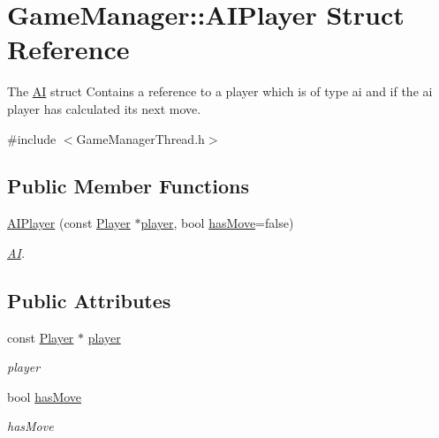\hypertarget{structGameManager_1_1AIPlayer}{\section{Game\-Manager\-:\-:A\-I\-Player Struct Reference}
\label{structGameManager_1_1AIPlayer}
}


The \hyperlink{classAI}{A\-I} struct Contains a reference to a player which is of type ai and if the ai player has calculated its next move.  




{\ttfamily \#include $<$Game\-Manager\-Thread.\-h$>$}

\subsection*{Public Member Functions}
\begin{DoxyCompactItemize}
\item 
\hyperlink{structGameManager_1_1AIPlayer_a9c991a2b7151183f89feefe97e6cfbec}{A\-I\-Player} (const \hyperlink{classPlayer}{Player} $\ast$\hyperlink{structGameManager_1_1AIPlayer_a96450dd315805b21d243f80787a53d6e}{player}, bool \hyperlink{structGameManager_1_1AIPlayer_a0930362037e6d84ec3888eacc8c3c10a}{has\-Move}=false)
\begin{DoxyCompactList}\small\item\em \hyperlink{classAI}{A\-I}. \end{DoxyCompactList}\end{DoxyCompactItemize}
\subsection*{Public Attributes}
\begin{DoxyCompactItemize}
\item 
\hypertarget{structGameManager_1_1AIPlayer_a96450dd315805b21d243f80787a53d6e}{const \hyperlink{classPlayer}{Player} $\ast$ \hyperlink{structGameManager_1_1AIPlayer_a96450dd315805b21d243f80787a53d6e}{player}}\label{structGameManager_1_1AIPlayer_a96450dd315805b21d243f80787a53d6e}

\begin{DoxyCompactList}\small\item\em player \end{DoxyCompactList}\item 
\hypertarget{structGameManager_1_1AIPlayer_a0930362037e6d84ec3888eacc8c3c10a}{bool \hyperlink{structGameManager_1_1AIPlayer_a0930362037e6d84ec3888eacc8c3c10a}{has\-Move}}\label{structGameManager_1_1AIPlayer_a0930362037e6d84ec3888eacc8c3c10a}

\begin{DoxyCompactList}\small\item\em has\-Move \end{DoxyCompactList}\end{DoxyCompactItemize}


